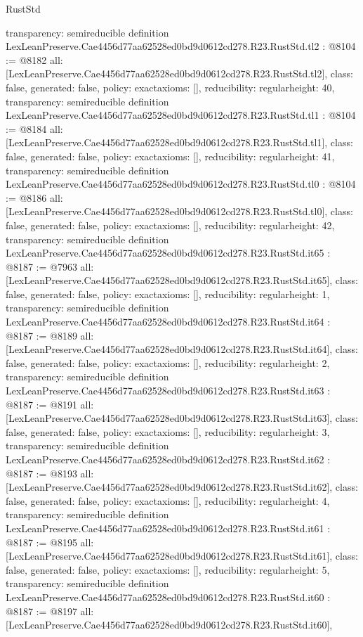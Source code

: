 \begin{lexlean}{RustStd}
\begin{coremodule}
{  transparency: semireducible
}
definition LexLeanPreserve.Cae4456d77aa62528ed0bd9d0612cd278.R23.RustStd.tl2 : @8104 := @8182 {
  all: [LexLeanPreserve.Cae4456d77aa62528ed0bd9d0612cd278.R23.RustStd.tl2],
  class: false,
  generated: false,
  policy: exact{axioms: []},
  reducibility: regular{height: 40},
  transparency: semireducible
}
definition LexLeanPreserve.Cae4456d77aa62528ed0bd9d0612cd278.R23.RustStd.tl1 : @8104 := @8184 {
  all: [LexLeanPreserve.Cae4456d77aa62528ed0bd9d0612cd278.R23.RustStd.tl1],
  class: false,
  generated: false,
  policy: exact{axioms: []},
  reducibility: regular{height: 41},
  transparency: semireducible
}
definition LexLeanPreserve.Cae4456d77aa62528ed0bd9d0612cd278.R23.RustStd.tl0 : @8104 := @8186 {
  all: [LexLeanPreserve.Cae4456d77aa62528ed0bd9d0612cd278.R23.RustStd.tl0],
  class: false,
  generated: false,
  policy: exact{axioms: []},
  reducibility: regular{height: 42},
  transparency: semireducible
}
definition LexLeanPreserve.Cae4456d77aa62528ed0bd9d0612cd278.R23.RustStd.it65 : @8187 := @7963 {
  all: [LexLeanPreserve.Cae4456d77aa62528ed0bd9d0612cd278.R23.RustStd.it65],
  class: false,
  generated: false,
  policy: exact{axioms: []},
  reducibility: regular{height: 1},
  transparency: semireducible
}
definition LexLeanPreserve.Cae4456d77aa62528ed0bd9d0612cd278.R23.RustStd.it64 : @8187 := @8189 {
  all: [LexLeanPreserve.Cae4456d77aa62528ed0bd9d0612cd278.R23.RustStd.it64],
  class: false,
  generated: false,
  policy: exact{axioms: []},
  reducibility: regular{height: 2},
  transparency: semireducible
}
definition LexLeanPreserve.Cae4456d77aa62528ed0bd9d0612cd278.R23.RustStd.it63 : @8187 := @8191 {
  all: [LexLeanPreserve.Cae4456d77aa62528ed0bd9d0612cd278.R23.RustStd.it63],
  class: false,
  generated: false,
  policy: exact{axioms: []},
  reducibility: regular{height: 3},
  transparency: semireducible
}
definition LexLeanPreserve.Cae4456d77aa62528ed0bd9d0612cd278.R23.RustStd.it62 : @8187 := @8193 {
  all: [LexLeanPreserve.Cae4456d77aa62528ed0bd9d0612cd278.R23.RustStd.it62],
  class: false,
  generated: false,
  policy: exact{axioms: []},
  reducibility: regular{height: 4},
  transparency: semireducible
}
definition LexLeanPreserve.Cae4456d77aa62528ed0bd9d0612cd278.R23.RustStd.it61 : @8187 := @8195 {
  all: [LexLeanPreserve.Cae4456d77aa62528ed0bd9d0612cd278.R23.RustStd.it61],
  class: false,
  generated: false,
  policy: exact{axioms: []},
  reducibility: regular{height: 5},
  transparency: semireducible
}
definition LexLeanPreserve.Cae4456d77aa62528ed0bd9d0612cd278.R23.RustStd.it60 : @8187 := @8197 {
  all: [LexLeanPreserve.Cae4456d77aa62528ed0bd9d0612cd278.R23.RustStd.it60],
}
\end{coremodule}
\end{lexlean}
